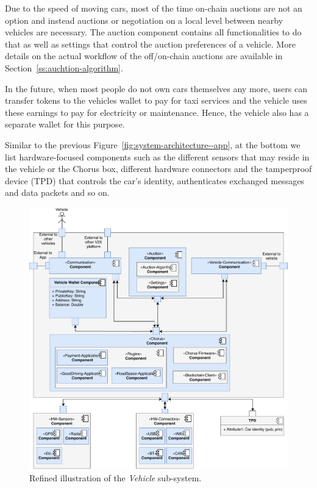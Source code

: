 \documentclass{llncs}
\begin{document}
{				Due to the speed of moving cars, most of the time on-chain auctions are not an option and instead auctions or negotiation on a local level between nearby vehicles are necessary. The auction component contains all functionalities to do that as well as settings that control the auction preferences of a vehicle. More details on the actual workflow of the off/on-chain auctions are available in Section~\ref{ss:auchtion-algorithm}.
							
				In the future, when most people do not own cars themselves any more, users can transfer tokens to the vehicles wallet to pay for taxi services and the vehicle uses these earnings to pay for electricity or maintenance. Hence, the vehicle also has a separate wallet for this purpose.
				
				Similar to the previous Figure~\ref{fig:system-architecture--app}, at the bottom we list hardware-focused components such as the different sensors that may reside in the vehicle or the Chorus box, different hardware connectors and the tamperproof device (TPD) that controls the car's identity, authenticates exchanged messages and data packets and so on.
				
				\begin{figure}
					\centering
					\includegraphics[scale=0.65]{Figures/longterm-architecture/20180507_Refined-sys-architecture--vehicle.pdf}
					\caption{Refined illustration of the \textit{Vehicle} sub-system.}	
					\label{fig:system-architecture--vehicle}
				\end{figure}
				
}
\end{document}
